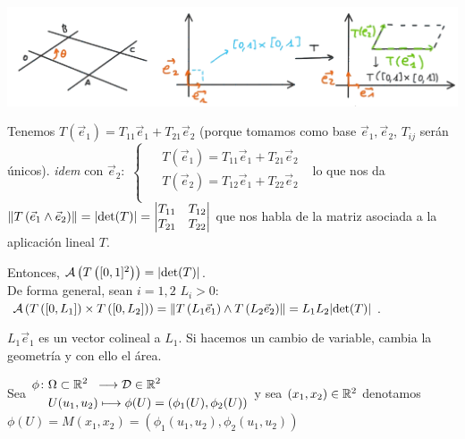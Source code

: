 \documentclass{report}
\begin{document}
    \begin{center}
      \includegraphics[width=\textwidth]{fotos/cambioVar.png}
    \end{center}

    \noindent Tenemos $T\left(\vec{e}_1\right)=T_{11}\vec{e}_1+T_{21}\vec{e}_2$ (porque tomamos como base $\vec{e}_1,\vec{e}_2$, $T_{ij}$ serán únicos). \textit{idem} con $\vec{e}_2\colon$
    $\begin{cases}
      \begin{aligned}
        &T\left(\vec{e}_1\right) = T_{11}\vec{e}_1+T_{21}\vec{e}_2 \\
        &T\left(\vec{e}_2\right) = T_{12}\vec{e}_1+T_{22}\vec{e}_2 \\
      \end{aligned}      
    \end{cases}$ lo que nos da $\lVert T\left(\vec{e}_1\wedge\vec{e}_2\right)\rVert=\lvert\text{det}(T)\rvert=
    \begin{vmatrix}
      T_{11} & T_{12} \\
      T_{21} & T_{22} \\
    \end{vmatrix}$ que nos habla de la matriz asociada a la aplicación lineal $T$.

    \noindent Entonces, $\mathcal{A}\left(T\left([0,1]^2\right)\right)=\lvert\text{det}(T)\rvert$.\\

    \noindent De forma general, sean $i=1,2$ $L_i>0$: $\mathcal{A}\left(T\left([0,L_1]\right)\times T\left([0,L_2]\right)\right)=
    \lVert T\left(L_1\vec{e}_1\right)\wedge T\left(L_2\vec{e}_2\right)\rVert=L_1L_2\lvert\text{det}(T)\rvert$. 
    
    \noindent $L_1\vec{e}_1$ es un vector colineal a $L_1$. Si hacemos un cambio de variable, cambia la geometría y con ello el área.

    \vspace{0.4cm}\noindent Sea 
    $\begin{aligned}
      \phi\colon &\Omega\subset\mathbb{R}^2\hspace{0.2cm}\longrightarrow\mathcal{D}\in\mathbb{R}^2\\
      &U(u_1,u_2)\longmapsto\phi(U)=\left(\phi_1(U),\phi_2(U)\right)\\
    \end{aligned}$ y sea $(x_1,x_2)\in\mathbb{R}^2$ denotamos $\phi(U)=M(x_1,x_2)=\left(\phi_1(u_1,u_2),\phi_2(u_1,u_2)\right)$
    
\end{document}
